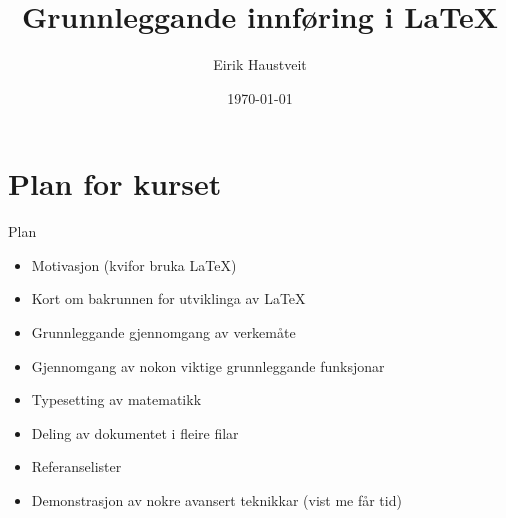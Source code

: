 \documentclass[10pt,a4paper]{beamer}
\title{Grunnleggande innføring i \LaTeX}
\date{\today}
\author{Eirik Haustveit}
\institute{Institutt for datateknologi, elektroteknologi og realfag}
\begin{document}
	
	\titlepage

	\section{Plan for kurset}

	\begin{frame}{Plan}
		
          \begin{itemize}
                        \item Motivasjon (kvifor bruka \LaTeX{})
			\item Kort om bakrunnen for utviklinga av \LaTeX{}
			\item Grunnleggande gjennomgang av verkemåte
			\item Gjennomgang av nokon viktige grunnleggande funksjonar
			\item Typesetting av matematikk
			\item Deling av dokumentet i fleire filar
			\item Referanselister
			\item Demonstrasjon av nokre avansert teknikkar (vist me får tid)
		\end{itemize}
		
	\end{frame}


	
	
	
	
	

	
	
	
	
	
	
	

	

	


        
\end{document}
